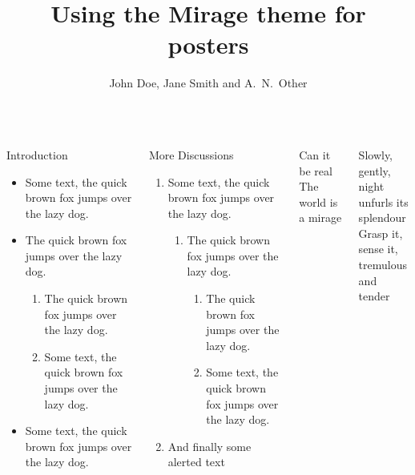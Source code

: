 \documentclass{beamer}
\title{Using the Mirage theme for posters}
\author{John Doe, Jane Smith and A.~N.~Other }
\begin{document}
\begin{frame}

\begin{columns}[T]
\begin{block}{Introduction}

\begin{itemize}
    \item Some text, the quick brown fox jumps over the lazy dog.
    \item The quick brown fox jumps over the lazy dog.

\begin{enumerate}
    \item The quick brown fox jumps over the lazy dog.
    \item Some text, the quick brown fox jumps over the lazy dog.
\end{enumerate}

    \item Some text, the quick brown fox jumps over the lazy dog.
\end{itemize}

\end{block}

\begin{block}{More Discussions}
    \begin{enumerate}
        \item Some text, the quick brown fox jumps over the lazy dog.
        \begin{enumerate}
	        \item The quick brown fox jumps over the lazy dog.
	        \begin{enumerate}
		        \item The quick brown fox jumps over the lazy dog.
		        \item Some text, the quick brown fox jumps over the lazy dog.
	        \end{enumerate}
        \end{enumerate}
        \item And finally some \alert{alerted text}
    \end{enumerate}
\end{block}

\begin{pullquote}
    Can it be real\\
    The world is a mirage
\end{pullquote}

\bigskip
    
\renewcommand{\MiragePullquoteOpen}{«}
\begin{pullquote}
Slowly, gently,\\
night unfurls its splendour\\
Grasp it, sense it,\\
tremulous and tender
\end{pullquote}


\end{columns}
\end{frame}
\end{document}
